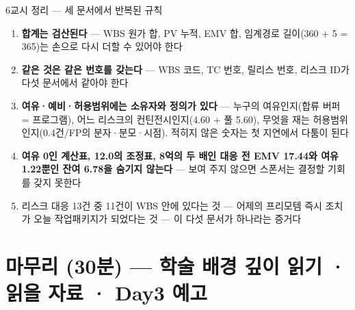 \begin{frame}{6교시 정리 — 세 문서에서 반복된 규칙}
\begin{enumerate}
\item \textbf{합계는 검산된다} — WBS 원가 합, PV 누적, EMV 합, 임계경로 길이(360 + 5 = 365)는 손으로 다시 더할 수 있어야 한다
\item \textbf{같은 것은 같은 번호를 갖는다} — WBS 코드, TC 번호, 릴리스 번호, 리스크 ID가 다섯 문서에서 같아야 한다
\item \textbf{여유·예비·허용범위에는 소유자와 정의가 있다} — 누구의 여유인지(합류 버퍼 = 프로그램), 어느 리스크의 컨틴전시인지(4.60 + 풀 5.60), 무엇을 재는 허용범위인지(0.4건/FP의 분자·분모·시점). 적히지 않은 숫자는 첫 지연에서 다툼이 된다
\item \textbf{여유 0인 계산표, 12.0의 조정표, 8억의 두 배인 대응 전 EMV 17.44와 여유 1.22뿐인 잔여 6.78을 숨기지 않는다} — 보여 주지 않으면 스폰서는 결정할 기회를 갖지 못한다
\item 리스크 대응 13건 중 11건이 WBS 안에 있다는 것 — 어제의 프리모템 즉시 조치가 오늘 작업패키지가 되었다는 것 — 이 다섯 문서가 하나라는 증거다
\end{enumerate}
\end{frame}

\section{마무리 (30분) — 학술 배경 깊이 읽기 · 읽을 자료 · Day3 예고}

